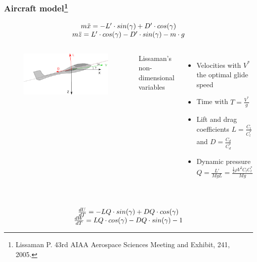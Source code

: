 \documentclass[compress]{beamer}
\begin{document}
\begin{frame}%
  \frametitle{Aircraft model\footnote{\tiny Lissaman P. 43rd AIAA Aerospace Sciences Meeting and Exhibit, 241, 2005.}}
  \begin{equation*}
    \begin{array}[c]{c}
      m \ddot{x} = -L' \cdot sin(\gamma) + D' \cdot cos(\gamma) \\
      m \ddot{z} = L' \cdot cos(\gamma) - D' \cdot sin(\gamma) - m \cdot g
    \end{array}
  \end{equation*}
  \begin{columns}
    \begin{figure}[h]
      \centering
      \includegraphics[width=1\textwidth]{./Figures/glider.eps}
    \end{figure}
    Lissaman's non-dimensional variables
    \begin{itemize}
      \item Velocities with $V^{*}$ the optimal glide speed
      \item Time with $T=\frac{V^{*}}{g}$
      \item Lift and drag coefficients $L= \frac{C_l}{C_l^*}$ and $D= \frac{C_d}{C_d^*}$
      \item Dynamic pressure $Q = \frac{L'}{MgL} = \frac{\frac{1}{2} \rho V^2 C_l C_l^* }{Mg}$
    \end{itemize}
  \end{columns}
  \begin{equation*}
    \begin{array}[c]{c}
      \\
      \frac{dU}{dT}= -LQ \cdot sin(\gamma) + DQ \cdot cos(\gamma) \\
      \frac{dW}{dT}= LQ \cdot cos(\gamma) - DQ \cdot sin(\gamma) - 1
    \end{array}
  \end{equation*}
\end{frame}
\end{document}
